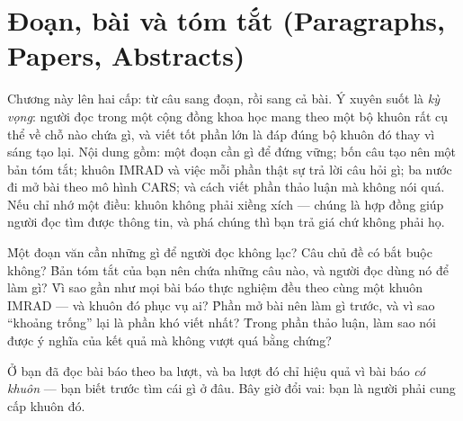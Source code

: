 \documentclass[../../english.tex]{subfiles}
\begin{document}
\chapter{Đoạn, bài và tóm tắt (Paragraphs, Papers, Abstracts)}

\begin{tomtat}
Chương này lên hai cấp: từ câu sang đoạn, rồi sang cả bài. Ý xuyên suốt là \emph{kỳ vọng}: người đọc trong một cộng đồng khoa học mang theo một bộ khuôn rất cụ thể về chỗ nào chứa gì, và viết tốt phần lớn là đáp đúng bộ khuôn đó thay vì sáng tạo lại. Nội dung gồm: một đoạn cần gì để đứng vững; bốn câu tạo nên một bản tóm tắt; khuôn IMRAD và việc mỗi phần thật sự trả lời câu hỏi gì; ba nước đi mở bài theo mô hình CARS; và cách viết phần thảo luận mà không nói quá. Nếu chỉ nhớ một điều: khuôn không phải xiềng xích --- chúng là hợp đồng giúp người đọc tìm được thông tin, và phá chúng thì bạn trả giá chứ không phải họ.
\end{tomtat}

\begin{nentang}
\end{nentang}

\begin{khoigoi}
\h{Một đoạn văn cần những gì để người đọc không lạc? Câu chủ đề có bắt buộc không?}
\h{Bản tóm tắt của bạn nên chứa những câu nào, và người đọc dùng nó để làm gì?}
\h{Vì sao gần như mọi bài báo thực nghiệm đều theo cùng một khuôn IMRAD --- và khuôn đó phục vụ ai?}
\h{Phần mở bài nên làm gì trước, và vì sao ``khoảng trống'' lại là phần khó viết nhất?}
\h{Trong phần thảo luận, làm sao nói được ý nghĩa của kết quả mà không vượt quá bằng chứng?}
\end{khoigoi}

Ở  bạn đã đọc bài báo theo ba lượt, và ba lượt đó chỉ hiệu quả vì bài báo \emph{có khuôn} --- bạn biết trước tìm cái gì ở đâu. Bây giờ đổi vai: bạn là người phải cung cấp khuôn đó.
\end{document}
